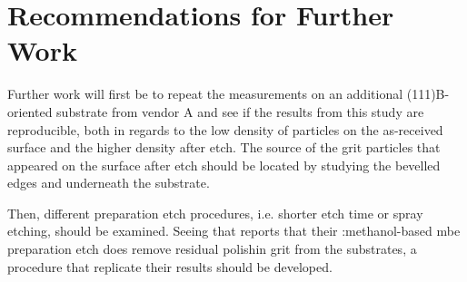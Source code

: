 \chapter{Recommendations for Further Work}\label{ch:further-work}
%

Further work will first be to repeat the measurements on an additional (111)B-oriented substrate from vendor A and see if the results from this study are reproducible, both in regards to the low density of particles on the as-received surface and the higher density after etch. The source of the grit particles that appeared on the surface after etch should be located by studying the bevelled edges and underneath the substrate. 

Then, different preparation etch procedures, i.e. shorter etch time or spray etching, should be examined. Seeing that \citet{benson2016analysis} reports that their :methanol-based \ac{mbe} preparation etch does remove residual  polishin grit from the substrates, a procedure that replicate their results should be developed.

%

